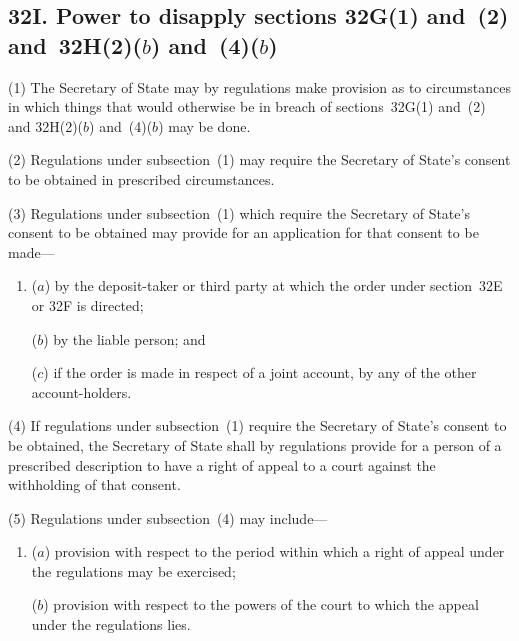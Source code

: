\documentclass[12pt,a4paper]{article}
\begin{document}

\begin{sloppypar}
\subsection{32I. Power to disapply sections 32G(1) and~(2) and~32H(2)($b$) and~(4)($b$)}
\end{sloppypar}

(1) The Secretary of State may by regulations make provision as to
circumstances in which things that would otherwise be in breach of sections~32G(1) and~(2) and 32H(2)($b$) and~(4)($b$) may be done.

(2) Regulations under subsection~(1) may require the 
Secretary of State's  %
consent
to be obtained in prescribed circumstances.

(3) Regulations under subsection~(1) which require the 
Secretary of State's  %
consent
to be obtained may provide for an application for that consent to be made---
\begin{enumerate}\item[]
($a$) by the deposit-taker or third party at which the order under section~32E or
32F is directed;

($b$) by the liable person; and

($c$) if the order is made in respect of a joint account, by any of the other account-holders.
\end{enumerate}

(4) If regulations under subsection~(1) require the 
Secretary of State's  %
consent to
be obtained, the Secretary of State shall by regulations provide for a person of a
prescribed description to have a right of appeal to a court against the withholding of
that consent.

(5) Regulations under subsection~(4) may include---
\begin{enumerate}\item[]
($a$) provision with respect to the period within which a right of appeal under the
regulations may be exercised;

($b$) provision with respect to the powers of the court to which the appeal under
the regulations lies.
\end{enumerate}
\end{document}
